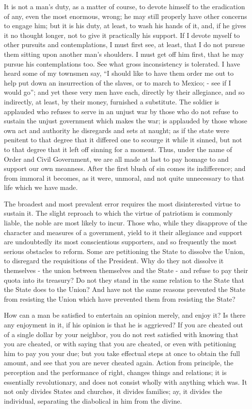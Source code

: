 \documentclass[letterpaper,12pt,english]{sphinxmanual}
\begin{document}
It is not a man's duty, as a matter of course, to devote himself to the eradication of any, even the most enormous, wrong; he may still properly have other concerns to engage him; but it is his duty, at least, to wash his hands of it, and, if he gives it no thought longer, not to give it practically his support. If I devote myself to other pursuits and contemplations, I must first see, at least, that I do not pursue them sitting upon another man's shoulders. I must get off him first, that he may pursue his contemplations too. See what gross inconsistency is tolerated. I have heard some of my townsmen say, ``I should like to have them order me out to help put down an insurrection of the slaves, or to march to Mexico; - see if I would go''; and yet these very men have each, directly by their allegiance, and so indirectly, at least, by their money, furnished a substitute. The soldier is applauded who refuses to serve in an unjust war by those who do not refuse to sustain the unjust government which makes the war; is applauded by those whose own act and authority he disregards and sets at naught; as if the state were penitent to that degree that it differed one to scourge it while it sinned, but not to that degree that it left off sinning for a moment. Thus, under the name of Order and Civil Government, we are all made at last to pay homage to and support our own meanness. After the first blush of sin comes its indifference; and from immoral it becomes, as it were, unmoral, and not quite unnecessary to that life which we have made.

The broadest and most prevalent error requires the most disinterested virtue to sustain it. The slight reproach to which the virtue of patriotism is commonly liable, the noble are most likely to incur. Those who, while they disapprove of the character and measures of a government, yield to it their allegiance and support are undoubtedly its most conscientious supporters, and so frequently the most serious obstacles to reform. Some are petitioning the State to dissolve the Union, to disregard the requisitions of the President. Why do they not dissolve it themselves - the union between themselves and the State - and refuse to pay their quota into its treasury? Do not they stand in the same relation to the State that the State does to the Union? And have not the same reasons prevented the State from resisting the Union which have prevented them from resisting the State?

How can a man be satisfied to entertain an opinion merely, and enjoy it? Is there any enjoyment in it, if his opinion is that he is aggrieved? If you are cheated out of a single dollar by your neighbor, you do not rest satisfied with knowing that you are cheated, or with saying that you are cheated, or even with petitioning him to pay you your due; but you take effectual steps at once to obtain the full amount, and see that you are never cheated again. Action from principle, the perception and the performance of right, changes things and relations; it is essentially revolutionary, and does not consist wholly with anything which was. It not only divides States and churches, it divides families; ay, it divides the individual, separating the diabolical in him from the divine.
\end{document}
